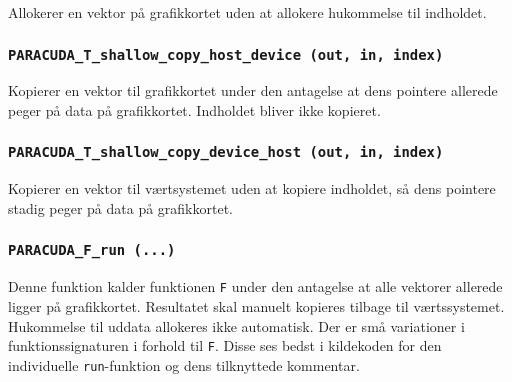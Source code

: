 Allokerer en vektor på grafikkortet uden at allokere hukommelse til indholdet.

\subsubsection*{\texttt{PARACUDA\_T\_shallow\_copy\_host\_device \scriptsize(out, in, index)}}

Kopierer en vektor til grafikkortet under den antagelse at dens pointere allerede peger
på data på grafikkortet. Indholdet bliver ikke kopieret.

\subsubsection*{\texttt{PARACUDA\_T\_shallow\_copy\_device\_host \scriptsize(out, in, index)}}

Kopierer en vektor til værtsystemet uden at kopiere indholdet, så dens pointere stadig
peger på data på grafikkortet.

\subsubsection*{\texttt{PARACUDA\_F\_run \scriptsize(...)}}

Denne funktion kalder funktionen \verb|F| under den antagelse at alle vektorer allerede
ligger på grafikkortet. Resultatet skal manuelt kopieres tilbage til værtssystemet.
Hukommelse til uddata allokeres ikke automatisk. Der er små variationer i 
funktionssignaturen i forhold til \verb|F|. Disse ses bedst i kildekoden for den
individuelle \verb|run|-funktion og dens tilknyttede kommentar.
